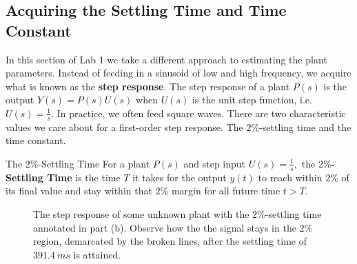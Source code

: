 \subsection{Acquiring the Settling Time and Time Constant}
In this section of Lab 1 we take a different approach to estimating the plant
parameters. Instead of feeding in a sinusoid of low and high frequency, we
acquire what is known as the \textbf{step response}. The step response of
a plant \(P(s)\) is the output \(Y(s) = P(s) U(s)\) when \(U(s)\) is the unit
step function, i.e. \(U(s) = \frac{1}{s}.\) In practice, we often feed
square waves.
%
There are two characteristic values we care about for a first-order step
response. The \(2\%\)-settling time and the time constant.
\begin{definition}[]{The \(2\%\)-Settling Time}
  For a plant \(P(s)\) and step input \(U(s) = \frac{1}{s},\)
  the \textbf{\(2\%\)-Settling Time} is the time \(T\) it takes for
  the output \(y(t)\) to reach within \(2\%\) of its final value and stay
  within that \(2\%\) margin for all future time \(t > T.\)
\end{definition}
%
\begin{figure}
  \centering
  \hfill
  \caption{
    The step response of some unknown plant with the \(2\%\)-settling time
    annotated in part (b). Observe how the the signal stays in
    the \(2\%\) region, demarcated by the broken lines,
    after the settling time of \(\SI{391.4}{ms}\) is attained.
  }
  \label{fig:lab1:settling-time}
\end{figure}

